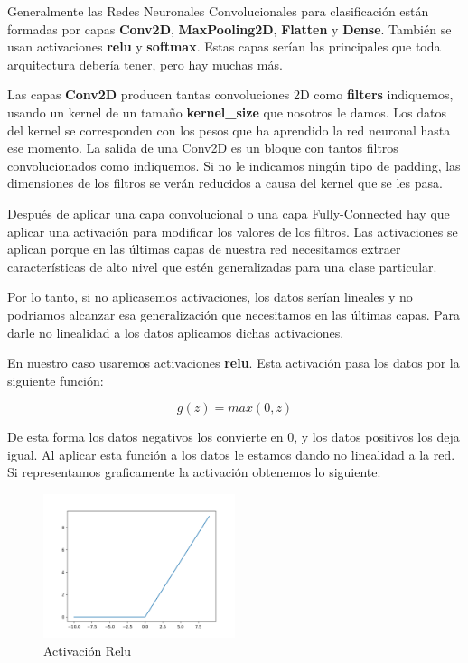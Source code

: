 \vspace{5 mm}

Generalmente las Redes Neuronales Convolucionales para clasificación están formadas por capas \textbf{Conv2D}, \textbf{MaxPooling2D}, \textbf{Flatten} y \textbf{Dense}. También se usan activaciones \textbf{relu} y \textbf{softmax}. Estas capas serían las principales que toda arquitectura debería tener, pero hay muchas más.

\vspace{2 mm}

Las capas \textbf{Conv2D} producen tantas convoluciones 2D como \textbf{filters} indiquemos, usando un kernel de un tamaño \textbf{kernel\_size} que nosotros le damos. Los datos del kernel se corresponden con los pesos que ha aprendido la red neuronal hasta ese momento. La salida de una Conv2D es un bloque con tantos filtros convolucionados como indiquemos. Si no le indicamos ningún tipo de padding, las dimensiones de los filtros se verán reducidos a causa del kernel que se les pasa.

\vspace{2 mm}

Después de aplicar una capa convolucional o una capa Fully-Connected hay que aplicar una activación para modificar los valores de los filtros. Las activaciones se aplican porque en las últimas capas de nuestra red necesitamos extraer características de alto nivel que estén generalizadas para una clase particular.

\vspace{2 mm}

Por lo tanto, si no aplicasemos activaciones, los datos serían lineales y no podriamos alcanzar esa generalización que necesitamos en las últimas capas. Para darle no linealidad a los datos aplicamos dichas activaciones.

\vspace{2 mm}

En nuestro caso usaremos activaciones \textbf{relu}. Esta activación pasa los datos por la siguiente función:

\[g(z) = max(0, z)\]

De esta forma los datos negativos los convierte en 0, y los datos positivos los deja igual. Al aplicar esta función a los datos le estamos dando no linealidad a la red. Si representamos graficamente la activación obtenemos lo siguiente:

\vspace{5 mm}

\begin{figure}[H]
\centering
  \includegraphics[width=0.5\textwidth]{Imagenes/relu.png}
   \caption{Activación Relu}
\end{figure}

